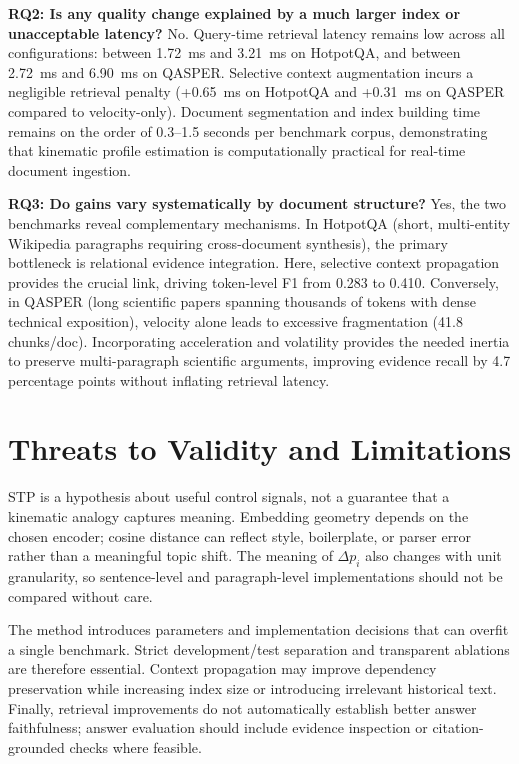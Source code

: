 \documentclass[conference]{IEEEtran}
\begin{document}
\textbf{RQ2: Is any quality change explained by a much larger index or unacceptable latency?}
No. Query-time retrieval latency remains low across all configurations: between 1.72~ms and 3.21~ms on HotpotQA, and between 2.72~ms and 6.90~ms on QASPER. Selective context augmentation incurs a negligible retrieval penalty (+0.65~ms on HotpotQA and +0.31~ms on QASPER compared to velocity-only). Document segmentation and index building time remains on the order of 0.3--1.5 seconds per benchmark corpus, demonstrating that kinematic profile estimation is computationally practical for real-time document ingestion.

\textbf{RQ3: Do gains vary systematically by document structure?}
Yes, the two benchmarks reveal complementary mechanisms. In HotpotQA (short, multi-entity Wikipedia paragraphs requiring cross-document synthesis), the primary bottleneck is relational evidence integration. Here, selective context propagation provides the crucial link, driving token-level F1 from 0.283 to 0.410. Conversely, in QASPER (long scientific papers spanning thousands of tokens with dense technical exposition), velocity alone leads to excessive fragmentation (41.8 chunks/doc). Incorporating acceleration and volatility provides the needed inertia to preserve multi-paragraph scientific arguments, improving evidence recall by 4.7 percentage points without inflating retrieval latency.

\section{Threats to Validity and Limitations}
STP is a hypothesis about useful control signals, not a guarantee that a kinematic analogy captures meaning. Embedding geometry depends on the chosen encoder; cosine distance can reflect style, boilerplate, or parser error rather than a meaningful topic shift. The meaning of $\Delta p_i$ also changes with unit granularity, so sentence-level and paragraph-level implementations should not be compared without care.

The method introduces parameters and implementation decisions that can overfit a single benchmark. Strict development/test separation and transparent ablations are therefore essential. Context propagation may improve dependency preservation while increasing index size or introducing irrelevant historical text. Finally, retrieval improvements do not automatically establish better answer faithfulness; answer evaluation should include evidence inspection or citation-grounded checks where feasible.
\end{document}

